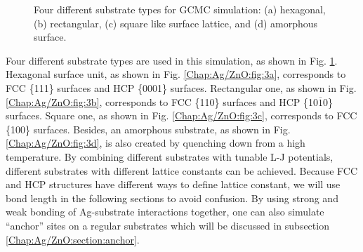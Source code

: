 \begin{figure}[!ht]
  \label{Chap:Ag/ZnO:fig:3d}
\caption[Four different substrate types for GCMC simulation.]{Four different substrate types for GCMC simulation: (a) hexagonal, (b) rectangular, (c) square like surface lattice, and (d) amorphous surface. }
  \label{Chap:Ag/ZnO:fig3}
\end{figure}
\endgroup

Four different substrate types are used in this simulation, as shown in Fig. \ref{Chap:Ag/ZnO:fig3}. Hexagonal surface unit, as shown in Fig. \ref{Chap:Ag/ZnO:fig:3a}, corresponds to \ac{FCC} \{111\} surfaces and \ac{HCP} \{0001\} surfaces. Rectangular one, as shown in Fig. \ref{Chap:Ag/ZnO:fig:3b}, corresponds to \ac{FCC} \{110\} surfaces and \ac{HCP} \{10$\overline{1}$0\} surfaces. Square one, as shown in Fig. \ref{Chap:Ag/ZnO:fig:3c}, corresponds to \ac{FCC} \{100\} surfaces. Besides, an amorphous substrate, as shown in Fig. \ref{Chap:Ag/ZnO:fig:3d}, is also created by quenching down from a high temperature. By combining different substrates with tunable \ac{L-J} potentials, different substrates with different lattice constants can be achieved. Because \ac{FCC} and \ac{HCP} structures have different ways to define lattice constant, we will use bond length in the following sections to avoid confusion. By using strong and weak bonding of Ag-substrate interactions together, one can also simulate ``anchor'' sites on a regular substrates which will be discussed in subsection \ref{Chap:Ag/ZnO:section:anchor}.